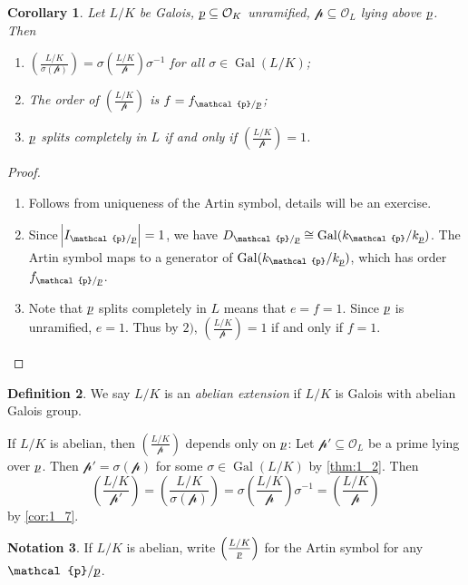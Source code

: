 \documentclass[11pt]{article}
\theoremstyle{definition}
\newtheorem{definition}{Definition}[section]
\newtheorem{notation}[definition]{Notation}
\theoremstyle{plain}
\newtheorem{corollary}[definition]{Corollary}
\theoremstyle{remark}
\DeclareMathOperator{\Gal}{Gal}
\newcommand{\cO}{\mathcal{O}}
\newcommand{\cp}{\mathcal{p}}
\newcommand{\up}{{\underline{\smash{p}}}}
\newcommand{\leg}[2]{\left(\frac{#1}{#2}\right)}
\begin{document}
\begin{corollary}\label{cor:1_7}
    Let $L/K$ be Galois, $\up \subseteq \cO_K$ unramified, $\cp \subseteq \cO_L$ lying above $\up$. Then
    \begin{enumerate}
        \item $\leg{L/K}{\sigma(\cp)} = \sigma \leg{L/K}{\cp} \sigma^{-1}$ for all $\sigma \in \Gal(L/K)$;

        \item The order of $\leg{L/K}{\cp}$ is $f = f_{\cp / \up}$;

        \item $\up$ splits completely in $L$ if and only if $\leg{L/K}{\cp} = 1$.
    \end{enumerate}
\end{corollary}
\begin{proof}\phantom{}
    \begin{enumerate}
        \item Follows from uniqueness of the Artin symbol, details will be an exercise.

        \item Since $\abs{I_{\cp / \up}} = 1$, we have $D_{\cp / \up} \cong \Gal(k_\cp / k_\up)$. The Artin symbol maps to a generator of $\Gal(k_\cp / k_\up)$, which has order $f_{\cp / \up}$.

        \item Note that $\up$ splits completely in $L$ means that $e = f = 1$. Since $\up$ is unramified, $e = 1$. Thus by $2)$, $\leg{L/K}{\cp} = 1$ if and only if $f = 1$. \qedhere
    \end{enumerate}
\end{proof}

\begin{definition}\label{def:1_8}
    We say $L/K$ is an \emph{abelian extension} if $L/K$ is Galois with abelian Galois group.
\end{definition}

If $L/K$ is abelian, then $\leg{L/K}{\cp}$ depends only on $\up$: Let $\cp' \subseteq \cO_L$ be a prime lying over $\up$. Then $\cp' = \sigma(\cp)$ for some $\sigma \in \Gal(L/K)$ by \autoref{thm:1_2}. Then
\begin{equation*}
    \leg{L/K}{\cp'} = \leg{L/K}{\sigma(\cp)} = \sigma \leg{L/K}{\cp} \sigma^{-1} = \leg{L/K}{\cp}
\end{equation*}
by \autoref{cor:1_7}.

\begin{notation}\label{not:1_9}
    If $L/K$ is abelian, write $\leg{L/K}{\up}$ for the Artin symbol for any $\cp / \up$.
\end{notation}
\end{document}
